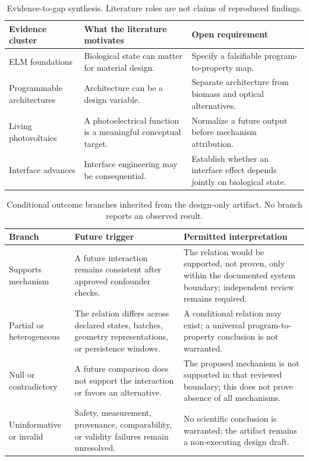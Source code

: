 \documentclass[conference]{IEEEtran}
\begin{document}
\begin{table}[t]
\caption{Evidence-to-gap synthesis. Literature roles are not claims of reproduced findings.}
\label{tab:evidence-gap}
\centering
\footnotesize
\renewcommand{\arraystretch}{1.12}
\setlength{\tabcolsep}{2pt}
\begin{tabular}{p{}p{}p{}}
\toprule
\textbf{Evidence cluster} & \textbf{What the literature motivates} & \textbf{Open requirement} \\
\midrule
ELM foundations \cite{nguyen2018,gilbert2019,liu2022} & Biological state can matter for material design. & Specify a falsifiable program-to-property map. \\
Programmable architectures \cite{chen2014,huang2019,durajthatte2021,toda2018,liu2020} & Architecture can be a design variable. & Separate architecture from biomass and optical alternatives. \\
Living photovoltaics \cite{schuergers2017,saper2018,zhu2019} & A photoelectrical function is a meaningful conceptual target. & Normalize a future output before mechanism attribution. \\
Interface advances \cite{reggente2024,chen2025} & Interface engineering may be consequential. & Establish whether an interface effect depends jointly on biological state. \\
\bottomrule
\end{tabular}
\end{table}

\begin{table}[t]
\caption{Conditional outcome branches inherited from the design-only artifact. No branch reports an observed result.}
\label{tab:outcome-branches}
\centering
\footnotesize
\renewcommand{\arraystretch}{1.12}
\setlength{\tabcolsep}{2pt}
\begin{tabular}{p{}p{}p{}}
\toprule
\textbf{Branch} & \textbf{Future trigger} & \textbf{Permitted interpretation} \\
\midrule
Supports mechanism & A future interaction remains consistent after approved confounder checks. & The relation would be supported, not proven, only within the documented system boundary; independent review remains required. \\
Partial or heterogeneous & The relation differs across declared states, batches, geometry representations, or persistence windows. & A conditional relation may exist; a universal program-to-property conclusion is not warranted. \\
Null or contradictory & A future comparison does not support the interaction or favors an alternative. & The proposed mechanism is not supported in that reviewed boundary; this does not prove absence of all mechanisms. \\
Uninformative or invalid & Safety, measurement, provenance, comparability, or validity failures remain unresolved. & No scientific conclusion is warranted; the artifact remains a non-executing design draft. \\
\bottomrule
\end{tabular}
\end{table}
\end{document}
